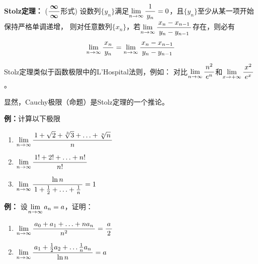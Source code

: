 \begin{thx}
	{\bf Stolz定理：}
	($\df{\bm{\infty}}{\bm{\infty}}$形式) 设数列$\{y_n\}$满足$\limn\df
	1{y_n}=0$，且$\{y_n\}$至少从某一项开始保持严格单调递增，
	则对任意数列$\{x_n\}$，若$\limn\df{x_n-x_{n-1}}{y_n-y_{n-1}}$存在，则必有
	$$\limn\df{x_n}{y_n}=\limn\df{x_n-x_{n-1}}{y_n-y_{n-1}}$$
\end{thx}

Stolz定理类似于函数极限中的L'Hospital法则，例如：
对比$\limn\df{n^2}{e^n}$和$\limx{+\infty}\df{x^2}{e^x}$。


显然，Cauchy极限（命题）是Stolz定理的一个推论。

{\bf 例：}计算以下极限
\begin{enumerate}[(1)]
  \setlength{\itemindent}{1cm}
  \item $\limn\df{1+\sqrt 2+\sqrt[3]{3}+\ldots+\sqrt[n]{n}}{n}$ 
  \item $\limn\df{1!+2!+\ldots+n!}{n!}$
  \item $\limn\df{\ln n}{1+\frac12+\ldots+\frac1n}=1$
\end{enumerate}

{\bf 例：} 设$\limn a_n=a$，证明：
\begin{enumerate}[(1)]
  \setlength{\itemindent}{1cm}
  \item $\limn\df{a_0+a_1+\ldots+na_n}{n^2}=\df a2$
  \item $\limn\df{a_1+\frac12a_2+\ldots\frac1na_n}{\ln n}=a$
\end{enumerate}

